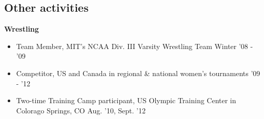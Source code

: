 \documentclass[margin]{res}
\begin{document}
\begin{resume}
\section{Other activities}
{\bf Wrestling}
\begin{itemize}[leftmargin=*] \itemsep -2pt
\item Team Member, MIT's NCAA Div. III Varsity Wrestling Team \hfill Winter '08 - '09
\item Competitor, US and Canada in regional \& national women's tournaments \hfill '09 - '12
\item Two-time Training Camp participant, US Olympic Training Center in Colorago Springs, CO \hfill Aug. '10, Sept. '12


\end{itemize}

\end{resume} 
 
\end{document}
